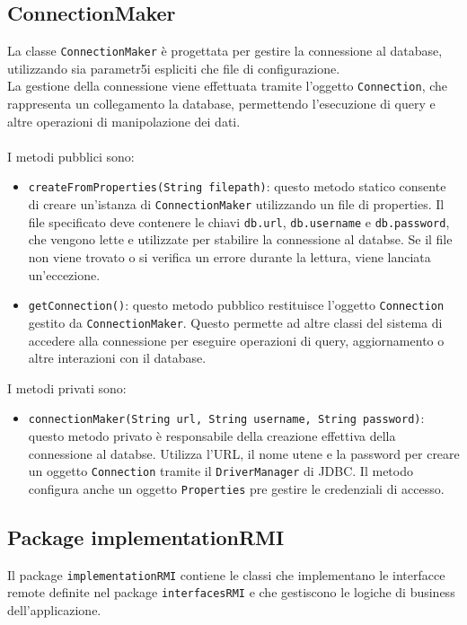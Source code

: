 \subsection{ConnectionMaker}
La classe \texttt{ConnectionMaker} è progettata per gestire la connessione al database, utilizzando sia parametr5i espliciti che file di configurazione.\\
La gestione della connessione viene effettuata tramite l'oggetto \texttt{Connection}, che rappresenta un collegamento la database, permettendo l'esecuzione di query e altre operazioni di manipolazione dei dati.\\
\\
I metodi pubblici sono:
\begin{itemize}
    \item \texttt{createFromProperties(String filepath)}:
          questo metodo statico consente di creare un'istanza di \texttt{ConnectionMaker} utilizzando un file di properties. Il file specificato deve contenere le chiavi \texttt{db.url}, \texttt{db.username} e \texttt{db.password},
          che vengono lette e utilizzate per stabilire la connessione al databse.
          Se il file non viene trovato o si verifica un errore durante la lettura, viene lanciata un'eccezione.
    \item \texttt{getConnection()}:
          questo metodo pubblico restituisce l'oggetto \texttt{Connection} gestito da \texttt{ConnectionMaker}. Questo permette ad altre classi del sistema di accedere alla connessione per eseguire operazioni di query, aggiornamento o altre interazioni con il database.
\end{itemize}
I metodi privati sono:
\begin{itemize}
    \item \texttt{connectionMaker(String url, String username, String password)}:
          questo metodo privato è responsabile della creazione effettiva della connessione al databse. Utilizza l'URL, il nome utene e la password per creare un oggetto \texttt{Connection} tramite il \texttt{DriverManager} di JDBC. Il metodo configura anche un oggetto \texttt{Properties} pre gestire le credenziali di accesso.
\end{itemize}




\subsection{Package implementationRMI}
Il package \texttt{implementationRMI} contiene le classi che implementano le interfacce remote definite nel package \texttt{interfacesRMI} e che gestiscono le logiche di business dell'applicazione.\\


